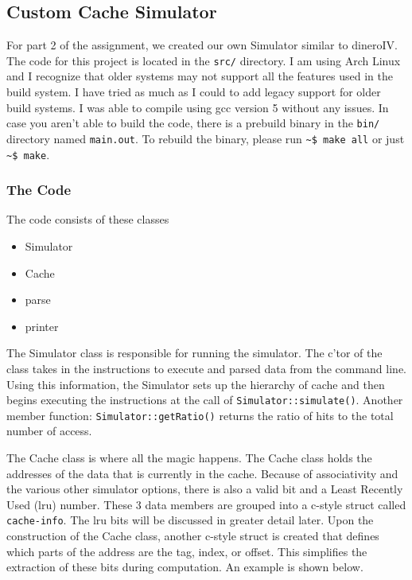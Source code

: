 \documentclass{article}
\begin{document}
    \subsection{Custom Cache Simulator}
        For part 2 of the assignment, we created our own Simulator similar to dineroIV. The code for this project is located in the \verb|src/| directory. I am using Arch Linux and I recognize that older systems may not support all the features used in the build system. I have tried as much as I could to add legacy support for older build systems. I was able to compile using gcc version 5 without any issues. In case you aren’t able to build the code, there is a prebuild binary in the \verb|bin/| directory named \verb|main.out|. To rebuild the binary, please run \verb|~$ make all| or just \verb|~$ make|.
        \subsubsection{The Code}
            The code consists of these classes
            \begin{itemize}
                \item Simulator
                \item Cache
                \item parse
                \item printer
            \end{itemize}
            The Simulator class is responsible for running the simulator. The c'tor of the class takes in the instructions to execute and parsed data from the command line. Using this information, the Simulator sets up the hierarchy of cache and then begins executing the instructions at the call of \verb|Simulator::simulate()|. Another member function: \verb|Simulator::getRatio()| returns the ratio of hits to the total number of access.
            \par
            The Cache class is where all the magic happens. The Cache class holds the addresses of the data that is currently in the cache. Because of associativity and the various other simulator options, there is also a valid bit and a Least Recently Used (lru) number. These 3 data members are grouped into a c-style struct called \verb|cache-info|. The lru bits will be discussed in greater detail later. Upon the construction of the Cache class, another c-style struct is created that defines which parts of the address are the tag, index, or offset. This simplifies the extraction of these bits during computation. An example is shown below.
\end{document}
